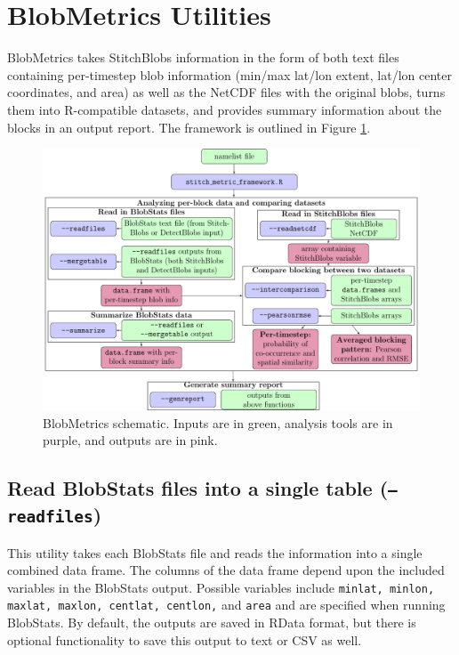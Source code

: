 \documentclass{article}
\begin{document}
\section{BlobMetrics Utilities}

BlobMetrics takes StitchBlobs information in the form of both text files containing per-timestep blob information (min/max lat/lon extent, lat/lon center coordinates, and area) as well as the NetCDF files with the original blobs, turns them into R-compatible datasets, and provides summary information about the blocks in an output report. The framework is outlined in Figure \ref{fig:schematic}.

\begin{figure}
\includegraphics[width=\textwidth]{Framework_figure.pdf}
\caption{BlobMetrics schematic. Inputs are in green, analysis tools are in purple, and outputs are in pink.}\label{fig:schematic}
\end{figure}

\subsection{Read BlobStats files into a single table (\texttt{--readfiles})}\label{readfiles}
This utility takes each BlobStats file and reads the information into a single combined data frame. The columns of the data frame depend upon the included variables in the BlobStats output. Possible variables include \texttt{minlat, minlon, maxlat, maxlon, centlat, centlon,} and \texttt{area} and are specified when running BlobStats. By default, the outputs are saved in RData format, but there is optional functionality to save this output to text or CSV as well.
\end{document}
